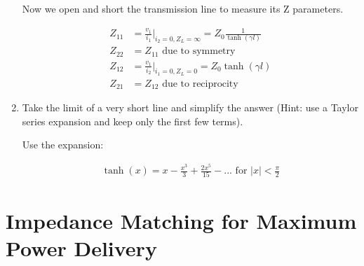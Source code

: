 \documentclass[11pt]{article}
\begin{document}
\begin{enumerate}
	Now we open and short the transmission line to measure its Z parameters.
	
	\begin{align*}
		Z_{11} &= \frac{v_1}{i_1} \bigg\rvert_{i_2 = 0, Z_L = \infty} = Z_0 \frac{1}{\tanh(\gamma l)} \\
		Z_{22} &= Z_{11} \text{ due to symmetry} \\
		Z_{12} &= \frac{v_1}{i_2} \bigg\rvert_{i_1 = 0, Z_L = 0} = Z_0 \tanh(\gamma l) \\
		Z_{21} &= Z_{12} \text{ due to reciprocity}
	\end{align*}
	
	\item Take the limit of a very short line and simplify the answer (Hint: use a Taylor series expansion and keep only the first few terms).
	
	Use the expansion:
	
	\begin{align*}
		\tanh(x) = x - \frac{x^3}{3} + \frac{2x^5}{15} - ... \text{ for } |x| < \frac{\pi}{2}
	\end{align*}
\end{enumerate}

\section{Impedance Matching for Maximum Power Delivery}
\end{document}
